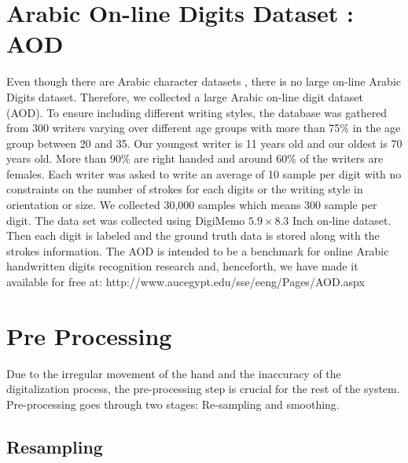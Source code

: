 \documentclass[times, 10pt,twocolumn]{article}
\begin{document}

\section{ Arabic On-line Digits Dataset : AOD}
\label{sec:Dataset}

  Even though there are Arabic character datasets \cite{ARAlamri2008,Mezghani3332005}, there is no large on-line Arabic Digits dataset. Therefore, we  collected a large Arabic on-line digit dataset (AOD). To ensure including different writing styles, the database was gathered from 300 writers varying over different age groups with more than  75\% in the age group between 20 and 35. Our youngest writer is 11 years old and our oldest is 70 years old. More than 90\%  are right handed and around  60\% of the writers are females. Each writer was asked to write an average of 10 sample per digit with no constraints on the number of strokes for each digits or the writing style in orientation or size. We collected  30,000 samples which means  300 sample per digit. The data set was collected using DigiMemo  $5.9 \times 8.3$ Inch on-line dataset. Then each digit is labeled and the  ground truth data is stored along with the strokes information. The AOD is intended to be a benchmark for online Arabic handwritten digits recognition research and, henceforth, we have made it available for free at: http://www.aucegypt.edu/sse/eeng/Pages/AOD.aspx %

\section{Pre Processing}
\label{sec:PreProcessing}

Due to the irregular movement of the hand and the inaccuracy of the digitalization process, the pre-processing step is crucial for the rest of the system. Pre-processing goes through two stages: Re-sampling and smoothing.

 \subsection{Resampling}
\end{document}
